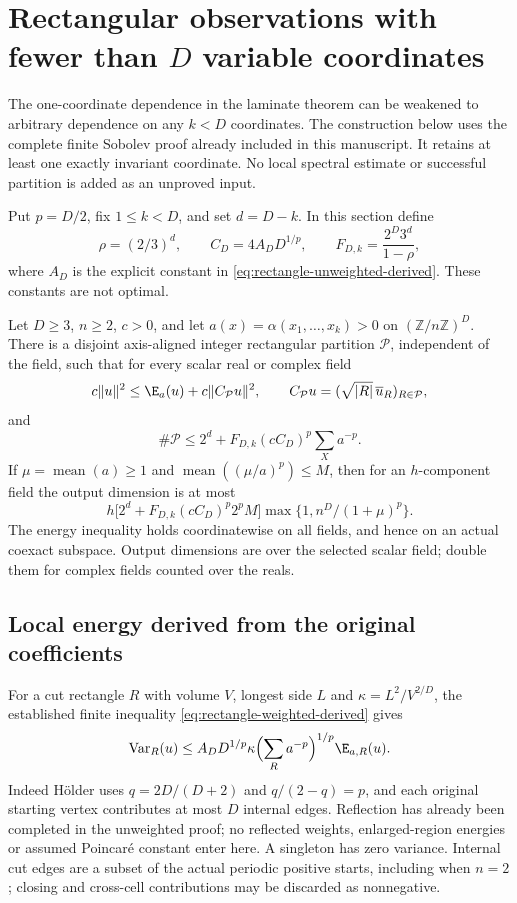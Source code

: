 \clearpage
\section{Rectangular observations with fewer than $D$ variable coordinates}
\label{sec:partial188}
The one-coordinate dependence in the laminate theorem can be weakened to
arbitrary dependence on any $k<D$ coordinates. The construction below uses
the complete finite Sobolev proof already included in this manuscript.
It retains at least one exactly invariant coordinate. No local spectral
estimate or successful partition is added as an unproved input.

Put $p=D/2$, fix $1\le k<D$, and set $d=D-k$. In this section define
\[
 \rho=(2/3)^d,\qquad C_D=4A_DD^{1/p},\qquad
 F_{D,k}=\frac{2^D3^d}{1-\rho},
\]
where $A_D$ is the explicit constant in
\eqref{eq:rectangle-unweighted-derived}. These constants are not optimal.
\begin{theorem}\label{thm:partial188}
Let $D\ge3$, $n\ge2$, $c>0$, and let
$a(x)=\alpha(x_1,\ldots,x_k)>0$ on $(\mathbb Z/n\mathbb Z)^D$.
There is a disjoint axis-aligned integer rectangular partition $\mathcal P$,
independent of the field, such that for every scalar real or complex field
\[
 c\|u\|^2\le\E_a(u)+c\|C_{\mathcal P}u\|^2,\qquad
 C_{\mathcal P}u=(\sqrt{|R|}\,\overline u_R)_{R\in\mathcal P},
\]
and
\begin{equation}\label{eq:partial-count188}
 \#\mathcal P\le2^d+F_{D,k}(cC_D)^p\sum_Xa^{-p}.
\end{equation}
If $\mu=\operatorname{mean}(a)\ge1$ and
$\operatorname{mean}((\mu/a)^p)\le M$, then for an $h$-component field the
output dimension is at most
\[
 h\bigl[2^d+F_{D,k}(cC_D)^p2^pM\bigr]
 \max\{1,n^D/(1+\mu)^p\}.
\]
The energy inequality holds coordinatewise on all fields, and hence on an
actual coexact subspace. Output dimensions are over the selected scalar
field; double them for complex fields counted over the reals.
\end{theorem}

\subsection{Local energy derived from the original coefficients}
For a cut rectangle $R$ with volume $V$, longest side $L$ and
$\kappa=L^2/V^{2/D}$, the established finite inequality
\eqref{eq:rectangle-weighted-derived} gives
\begin{equation}\label{eq:partial-local188}
 \operatorname{Var}_R(u)\le A_D D^{1/p}\kappa
      \Bigl(\sum_Ra^{-p}\Bigr)^{1/p}\E_{a,R}(u).
\end{equation}
Indeed H\"older uses $q=2D/(D+2)$ and $q/(2-q)=p$, and each original
starting vertex contributes at most $D$ internal edges. Reflection has
already been completed in the unweighted proof; no reflected weights,
enlarged-region energies or assumed Poincar\'e constant enter here.
A singleton has zero variance. Internal cut edges are a subset of the
actual periodic positive starts, including when $n=2$; closing and
cross-cell contributions may be discarded as nonnegative.

